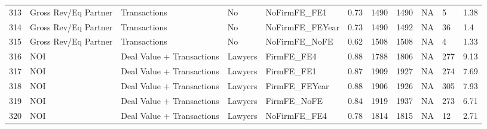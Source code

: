 \documentclass{article}
\begin{document}
\begin{table}[H]
\begin{tabular}{rllllllllll}
  313 & Gross Rev/Eq Partner & Transactions & No & NoFirmFE\_FE1 & 0.73 & 1490 & 1490 & NA & 5 & 1.38 \\ 
  314 & Gross Rev/Eq Partner & Transactions & No & NoFirmFE\_FEYear & 0.73 & 1490 & 1492 & NA & 36 & 1.4 \\ 
  315 & Gross Rev/Eq Partner & Transactions & No & NoFirmFE\_NoFE & 0.62 & 1508 & 1508 & NA & 4 & 1.33 \\ 
  316 & NOI & Deal Value + Transactions & Lawyers & FirmFE\_FE4 & 0.88 & 1788 & 1806 & NA & 277 & 9.13 \\ 
  317 & NOI & Deal Value + Transactions & Lawyers & FirmFE\_FE1 & 0.87 & 1909 & 1927 & NA & 274 & 7.69 \\ 
  318 & NOI & Deal Value + Transactions & Lawyers & FirmFE\_FEYear & 0.88 & 1906 & 1926 & NA & 305 & 7.93 \\ 
  319 & NOI & Deal Value + Transactions & Lawyers & FirmFE\_NoFE & 0.84 & 1919 & 1937 & NA & 273 & 6.71 \\ 
  320 & NOI & Deal Value + Transactions & Lawyers & NoFirmFE\_FE4 & 0.78 & 1814 & 1815 & NA & 12 & 2.71 \\ 
   \hline
\end{tabular}
\end{table}
\end{document}
